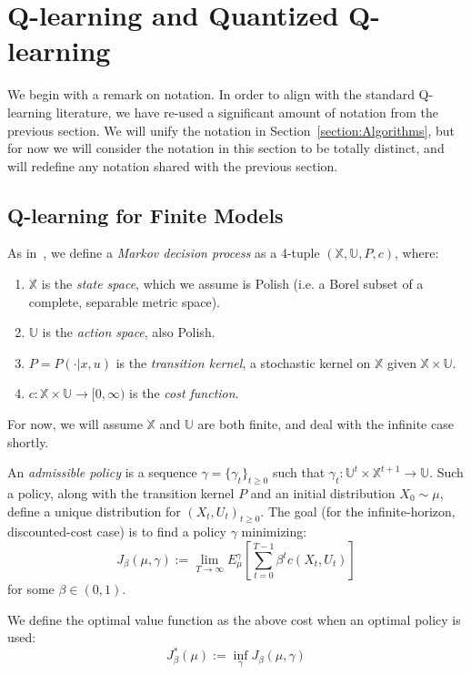 \documentclass[conference]{IEEEtran}
\begin{document}
\section{Q-learning and Quantized Q-learning}\label{section:Q-learning}
We begin with a remark on notation. In order to align with the standard Q-learning literature, we have re-used a significant amount of notation from the previous section. We will unify the notation in Section~\ref{section:Algorithms}, but for now we will consider the notation in this section to be totally distinct, and will redefine any notation shared with the previous section.

\subsection{Q-learning for Finite Models}
As in~\cite[Chapter 2]{Lerma}, we define a \emph{Markov decision process} as a 4-tuple \((\mathbb{X},\mathbb{U},P,c)\), where:
\begin{enumerate}
    \item \(\mathbb{X}\) is the \emph{state space}, which we assume is Polish (i.e. a Borel subset of a complete, separable metric space).
    \item \(\mathbb{U}\) is the \emph{action space}, also Polish.
    \item \(P = P(\cdot|x,u)\) is the \emph{transition kernel}, a stochastic kernel on \(\mathbb{X}\) given \(\mathbb{X} \times \mathbb{U}\).
    \item \(c : \mathbb{X} \times \mathbb{U} \to [0,\infty)\) is the \emph{cost function}.
\end{enumerate}

For now, we will assume \(\mathbb{X}\) and \(\mathbb{U}\) are both finite, and deal with the infinite case shortly.

An \emph{admissible policy} is a sequence \(\gamma = \{\gamma_t\}_{t\ge0}\) such that \(\gamma_t : \mathbb{U}^t \times \mathbb{X}^{t+1} \to \mathbb{U}\). Such a policy, along with the transition kernel \(P\) and an initial distribution \(X_0 \sim \mu\), define a unique distribution for \((X_t,U_t)_{t\ge0}\). The goal (for the infinite-horizon, discounted-cost case) is to find a policy \(\gamma\) minimizing:
\[J_\beta(\mu,\gamma) := \lim_{T\to\infty}E^\gamma_\mu\left[\sum_{t=0}^{T-1}\beta^t c(X_t,U_t) \right]\]
for some \(\beta \in (0,1)\).

We define the optimal value function as the above cost when an optimal policy is used:
\[J_\beta^*(\mu) := \inf_{\gamma}J_\beta(\mu,\gamma)\]
\end{document}
